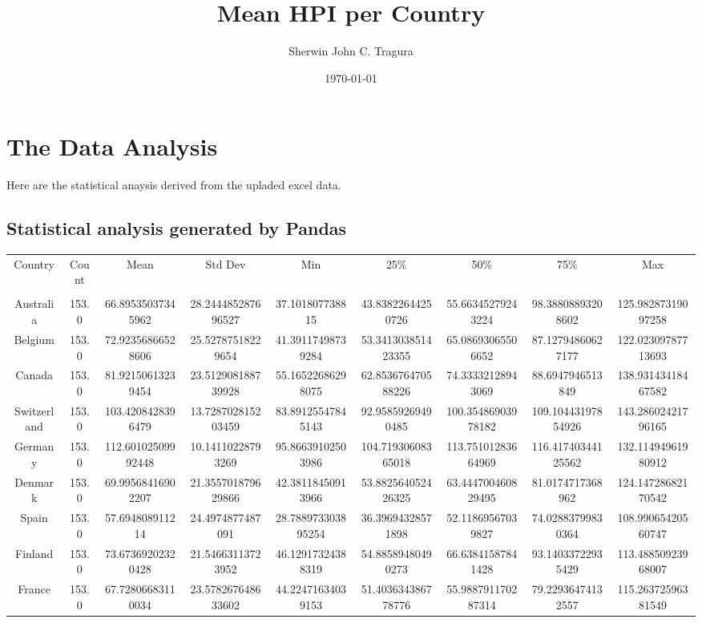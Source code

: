 \documentclass[10pt,legalpaper]{article}%
\title{Mean HPI per Country}%
\author{Sherwin John C. Tragura}%
\date{\today}%
\begin{document}
%
\normalsize%
\maketitle%
\section{The Data Analysis}%
\label{sec:TheDataAnalysis}%
Here are the statistical anaysis derived from the upladed excel data.%
\subsection{Statistical analysis generated by Pandas}%
\label{subsec:StatisticalanalysisgeneratedbyPandas}%
\begin{tabular}{| c | c | c | c | c | c | c | c | c |}%
\hline%
Country&Count&Mean&Std Dev&Min&25\%&50\%&75\%&Max\\%
&&&&&&&&\\%
\hline%
Australia&153.0&66.89535037345962&28.244485287696527&37.101807738815&43.83822644250726&55.66345279243224&98.38808893208602&125.98287319097258\\%
\hline%
Belgium&153.0&72.92356866528606&25.52787518229654&41.39117498739284&53.341303851423355&65.08693065506652&87.12794860627177&122.02309787713693\\%
\hline%
Canada&153.0&81.92150613239454&23.512908188739928&55.16522686298075&62.853676470588226&74.33332128943069&88.6947946513849&138.93143418467582\\%
\hline%
Switzerland&153.0&103.4208428396479&13.728702815203459&83.89125547845143&92.95859269490485&100.35486903978182&109.10443197854926&143.28602421796165\\%
\hline%
Germany&153.0&112.60102509992448&10.14110228793269&95.86639102503986&104.71930608365018&113.75101283664969&116.41740344125562&132.11494961980912\\%
\hline%
Denmark&153.0&69.99568416902207&21.355701879629866&42.38118450913966&53.882564052426325&63.444700460829495&81.0174717368962&124.14728682170542\\%
\hline%
Spain&153.0&57.694808911214&24.4974877487091&28.788973303895254&36.39694328571898&52.11869567039827&74.02883799830364&108.99065420560747\\%
\hline%
Finland&153.0&73.67369202320428&21.54663113723952&46.12917324388319&54.88589480490273&66.63841587841428&93.14033722935429&113.48850923968007\\%
\hline%
France&153.0&67.72806683110034&23.578267648633602&44.22471634039153&51.403634386778776&55.988791170287314&79.22936474132557&115.26372596381549\\%

\end{tabular}
\end{document}
